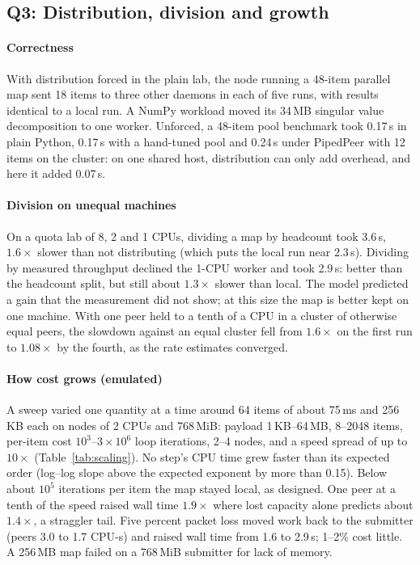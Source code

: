 \documentclass[5p,times,twocolumn]{elsarticle}
\begin{document}
\subsection{Q3: Distribution, division and growth}
\label{sec:eval-dist}

\paragraph{Correctness} With distribution forced in the plain lab, the node
running a 48-item parallel map sent 18 items to three other daemons in each of
five runs, with results identical to a local run. A NumPy workload moved its
34\,MB singular value decomposition to one worker. Unforced, a 48-item pool
benchmark took 0.17\,s in plain Python, 0.17\,s with a hand-tuned pool and
0.24\,s under PipedPeer with 12 items on the cluster: on one shared host,
distribution can only add overhead, and here it added 0.07\,s.

\paragraph{Division on unequal machines} On a quota lab of 8, 2 and 1 CPUs,
dividing a map by headcount took 3.6\,s, $1.6\times$ slower than not
distributing (which puts the local run near 2.3\,s). Dividing by measured
throughput declined the 1-CPU worker and took 2.9\,s: better than the
headcount split, but still about $1.3\times$ slower than local. The model
predicted a gain that the measurement did not show; at this size the map is
better kept on one machine. With one peer held to a tenth of a CPU in a cluster
of otherwise equal peers, the slowdown against an equal cluster fell from
$1.6\times$ on the first run to $1.08\times$ by the fourth, as the rate
estimates converged.

\paragraph{How cost grows (emulated)} A sweep varied one quantity at a time
around 64 items of about 75\,ms and 256\,KB each on nodes of 2 CPUs and
768\,MiB: payload 1\,KB--64\,MB, 8--2048 items, per-item cost
$10^3$--$3\times10^6$ loop iterations, 2--4 nodes, and a speed spread of up to
$10\times$ (Table~\ref{tab:scaling}). No step's CPU time grew faster than its
expected order (log--log slope above the expected exponent by more than 0.15).
Below about $10^5$ iterations per item the map stayed local, as designed. One
peer at a tenth of the speed raised wall time $1.9\times$ where lost capacity
alone predicts about $1.4\times$, a straggler tail. Five percent packet loss
moved work back to the submitter (peers 3.0 to 1.7 CPU-s) and raised wall time
from 1.6 to 2.9\,s; 1--2\% cost little. A 256\,MB map failed on a 768\,MiB
submitter for lack of memory.
\end{document}
